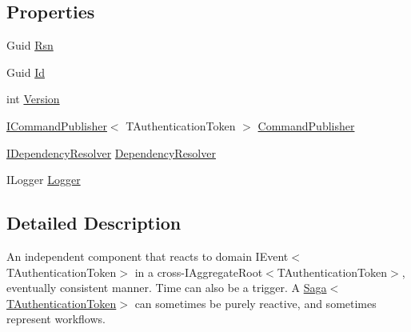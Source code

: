 \subsection*{Properties}
\begin{DoxyCompactItemize}
\item 
Guid \hyperlink{classCqrs_1_1Domain_1_1Saga_a2a7053e3d31629aa8a25cb38a238aca5_a2a7053e3d31629aa8a25cb38a238aca5}{Rsn}
\item 
Guid \hyperlink{classCqrs_1_1Domain_1_1Saga_af6b9552a90fcbe5c101c413126256565_af6b9552a90fcbe5c101c413126256565}{Id}
\item 
int \hyperlink{classCqrs_1_1Domain_1_1Saga_a581e88da4e3e76d3704586f97866a7a6_a581e88da4e3e76d3704586f97866a7a6}{Version}
\item 
\hyperlink{interfaceCqrs_1_1Commands_1_1ICommandPublisher}{I\+Command\+Publisher}$<$ T\+Authentication\+Token $>$ \hyperlink{classCqrs_1_1Domain_1_1Saga_a944fc264b716dcd60a2e51c9897766fa_a944fc264b716dcd60a2e51c9897766fa}{Command\+Publisher}
\item 
\hyperlink{interfaceCqrs_1_1Configuration_1_1IDependencyResolver}{I\+Dependency\+Resolver} \hyperlink{classCqrs_1_1Domain_1_1Saga_afd8b9bae392272e1651f2ea53c65db12_afd8b9bae392272e1651f2ea53c65db12}{Dependency\+Resolver}
\item 
I\+Logger \hyperlink{classCqrs_1_1Domain_1_1Saga_aafb1c7c3c83211709322470a8fd150b5_aafb1c7c3c83211709322470a8fd150b5}{Logger}
\end{DoxyCompactItemize}


\subsection{Detailed Description}
An independent component that reacts to domain I\+Event$<$\+T\+Authentication\+Token$>$ in a cross-\/I\+Aggregate\+Root$<$\+T\+Authentication\+Token$>$, eventually consistent manner. Time can also be a trigger. A \hyperlink{classCqrs_1_1Domain_1_1Saga_a1b6019cecbbf2572b64dd456cb5d91a2_a1b6019cecbbf2572b64dd456cb5d91a2}{Saga$<$\+T\+Authentication\+Token$>$} can sometimes be purely reactive, and sometimes represent workflows. 

